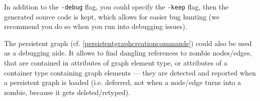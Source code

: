 In addition to the \texttt{-debug} flag, you could specify the \texttt{-keep} flag, then the generated source code is kept, which allows for easier bug hunting (we recommend you do so when you run into debugging issues).

The persistent graph (cf. \ref{persistentgraphcreationcommands}) could also be used as a debugging aide.
It allows to find dangling references to zombie nodes/edges, that are contained in attributes of graph element type, or attributes of a container type containing graph elements --- they are detected and reported when a persistent graph is loaded (i.e. deferred, not when a node/edge turns into a zombie, because it gets deleted/retyped).

